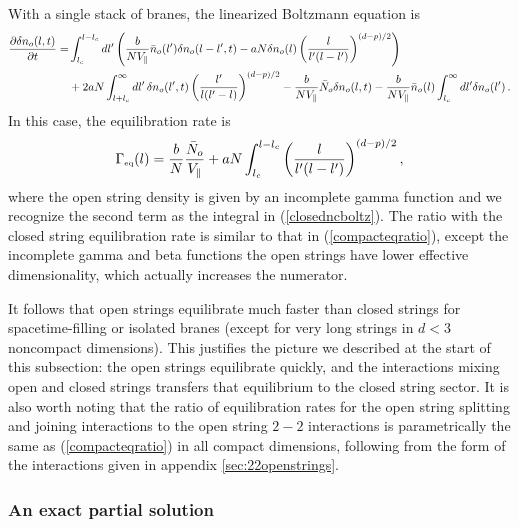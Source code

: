 \documentclass[a4paper,11pt]{article}
\begin{document}
{{{{{{{{{{{{With a single stack of branes, the linearized Boltzmann equation is
\begin{equation}
\begin{split}
\frac{\partial \delta n_o(l,t)}{\partial t}=& 
\int_{l_c}^{l-l_c}{dl'\left(\frac{b}{NV_\parallel } \Bar{n}_o(l')\delta n_o(l-l',t)
-aN \delta n_o(l)\left(\frac{l}{l'(l-l')}\right)^{(d-p)/2}\right)}\\
&+2aN\int_{l+l_c}^\infty {dl'\, \delta n_o(l',t)\left(\frac{l'}{l(l'-l)}\right)^{(d-p)/2}}-\frac{b}{NV_\parallel}\bar{N}_o\delta n_o(l,t) -\frac{b}{N V_\parallel}\Bar{n}_o(l)
\int_{l_c}^\infty dl' \delta n_o(l')\, .
\end{split}
\end{equation}
In this case, the equilibration rate is
\begin{equation}
    \Gamma_{\text{\tiny{eq}}}(l)=\frac{b}{N}\frac{\bar{N}_o}{V_\parallel}+aN
\int_{l_c}^{l-l_c} \left(\frac{l}{l'(l-l')}\right)^{(d-p)/2} ,
\end{equation}
where the open string density is given by an incomplete gamma function
and we recognize the second term as the integral in (\ref{closedncboltz}).
The ratio with the closed string equilibration rate is similar to that in
(\ref{compacteqratio}), except the incomplete gamma and beta functions
the open strings have lower effective dimensionality, which actually increases
the numerator.

It follows that open strings equilibrate much faster than closed strings for spacetime-filling or isolated branes (except for very long strings in $d<3$ 
noncompact dimensions). This justifies the picture we described at the start 
of this subsection: the open strings equilibrate quickly, and the interactions
mixing open and closed strings transfers that equilibrium to the closed string
sector. It is also worth noting that the ratio of equilibration rates
for the open string splitting and joining interactions to the open string
$2-2$ interactions is parametrically the same as (\ref{compacteqratio})
in all compact dimensions, following from the form of the interactions
given in appendix \ref{sec:22openstrings}.


\subsubsection*{An exact partial solution}

}}}}}}}}}}}}
\end{document}
